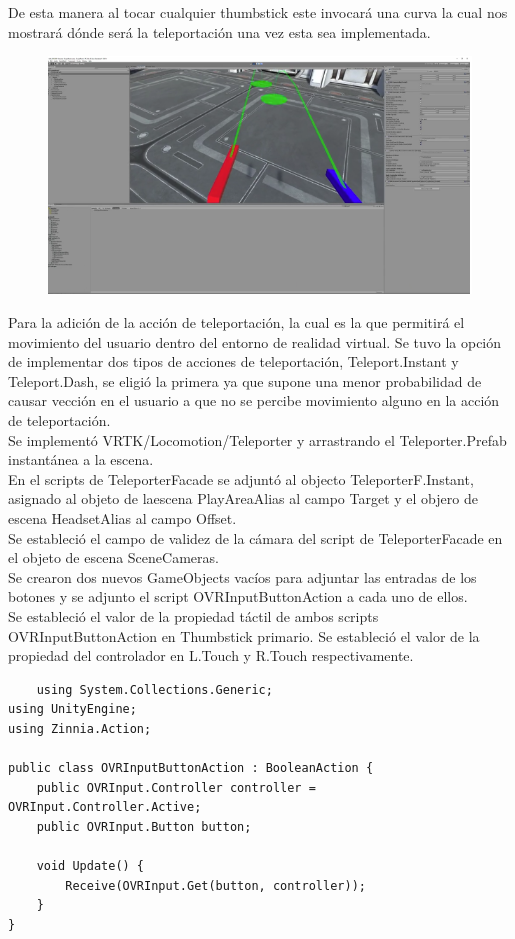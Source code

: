 De esta manera al tocar cualquier thumbstick este invocará una curva la cual nos mostrará dónde será la teleportación una vez esta sea implementada.\\
\begin{figure}[H]
	\begin{center}
 		\includegraphics[width = .5\textwidth]{source/images/image73.png}
	\end{center} 
\end{figure}

Para la adición de la acción de teleportación, la cual es la que permitirá el movimiento del usuario dentro del entorno de realidad virtual. Se tuvo la opción de 
implementar dos tipos de acciones de teleportación, Teleport.Instant y Teleport.Dash, se eligió la primera ya que supone una menor probabilidad de causar vección en el usuario 
 a que no se percibe movimiento alguno en la acción de teleportación.\\
Se implementó VRTK/Locomotion/Teleporter y arrastrando el Teleporter.Prefab instantánea a la escena.\\
En el scripts de TeleporterFacade se adjunt\'o al objecto TeleporterF.Instant, asignado al objeto de laescena PlayAreaAlias al campo Target y el objero de escena HeadsetAlias al campo Offset.\\
Se estableció el campo de validez de la cámara del script de TeleporterFacade en el objeto de escena SceneCameras.\\
Se crearon dos nuevos GameObjects vacíos  para adjuntar las entradas de los botones y se adjunto el script OVRInputButtonAction a cada uno de ellos.\\
Se estableció el valor de la propiedad táctil de ambos scripts OVRInputButtonAction en Thumbstick primario. Se estableció el valor de la propiedad del controlador en 
L.Touch y R.Touch respectivamente.\\

\begin{verbatim}
    using System.Collections.Generic;
using UnityEngine;
using Zinnia.Action;
 
public class OVRInputButtonAction : BooleanAction {
    public OVRInput.Controller controller = OVRInput.Controller.Active;
    public OVRInput.Button button;
 
    void Update() {
        Receive(OVRInput.Get(button, controller));
    }
}
\end{verbatim}

